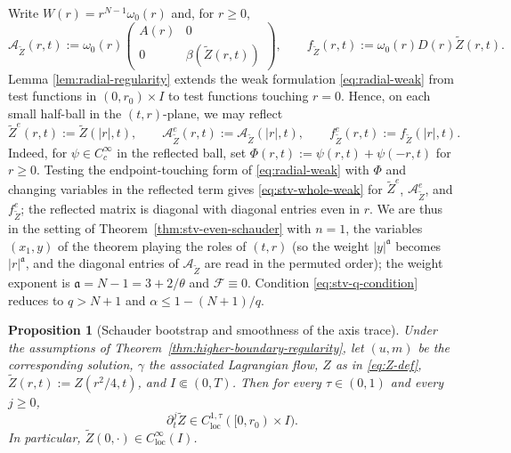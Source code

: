 \documentclass[11pt]{amsart}
\newtheorem{proposition}[theorem]{Proposition}
\newcommand{\loc}{\mathrm{loc}}
\begin{document}
Write \(W(r)=r^{N-1}\omega_0(r)\) and, for \(r\ge0\),
\[
        \mathcal A_{\widetilde Z}(r,t):=\omega_0(r)
        \begin{pmatrix}
        A(r)&0\\
        0&\beta(\widetilde Z(r,t))
        \end{pmatrix},
        \qquad
        f_{\widetilde Z}(r,t):=\omega_0(r)D(r)\widetilde Z(r,t).
\]
Lemma \ref{lem:radial-regularity} extends the weak formulation
\eqref{eq:radial-weak} from test functions in \((0,r_0)\times I\) to test
functions touching \(r=0\). Hence, on each small half-ball in the
\((t,r)\)-plane, we may reflect
\[
        \widetilde Z^e(r,t):=\widetilde Z(|r|,t),\qquad
        \mathcal A_{\widetilde Z}^e(r,t):=\mathcal A_{\widetilde Z}(|r|,t),
        \qquad
        f_{\widetilde Z}^e(r,t):=f_{\widetilde Z}(|r|,t).
\]
Indeed, for \(\psi\in C_c^\infty\) in the reflected ball, set
\(\Phi(r,t):=\psi(r,t)+\psi(-r,t)\) for \(r\ge0\). Testing the
endpoint-touching form of \eqref{eq:radial-weak} with \(\Phi\) and changing
variables in the reflected term gives \eqref{eq:stv-whole-weak} for \(\widetilde Z^e\),
\(\mathcal A_{\widetilde Z}^e\), and \(f_{\widetilde Z}^e\); the reflected matrix is diagonal with
diagonal entries even in \(r\).
We are thus in the setting of Theorem~\ref{thm:stv-even-schauder} with
\(n=1\), the variables \((x_1,y)\) of the theorem playing the roles of
\((t,r)\) (so the weight \(|y|^{\mathfrak a}\) becomes \(|r|^{\mathfrak a}\),
and the diagonal entries of \(\mathcal A_{\widetilde Z}\) are read in the
permuted order); the weight exponent is \(\mathfrak a=N-1=3+2/\theta\) and
\(\mathcal F\equiv0\). Condition \eqref{eq:stv-q-condition} reduces to
\(q>N+1\) and \(\alpha\le1-(N+1)/q\).

\begin{proposition}[Schauder bootstrap and smoothness of the axis trace]
\label{prop:endpoint-schauder-bootstrap}
Under the assumptions of Theorem~\ref{thm:higher-boundary-regularity},
let \((u,m)\) be the corresponding solution, \(\gamma\) the associated
Lagrangian flow, \(Z\) as in \eqref{eq:Z-def},
\(\widetilde Z(r,t):=Z(r^2/4,t)\), and \(I\Subset(0,T)\). Then for every
\(\tau\in(0,1)\) and every \(j\ge0\),
\[
        \partial_t^j\widetilde Z\in C^{1,\tau}_{\loc}([0,r_0)\times I).
\]
In particular, \(\widetilde Z(0,\cdot)\in C^\infty_{\loc}(I)\).
\end{proposition}
\end{document}
